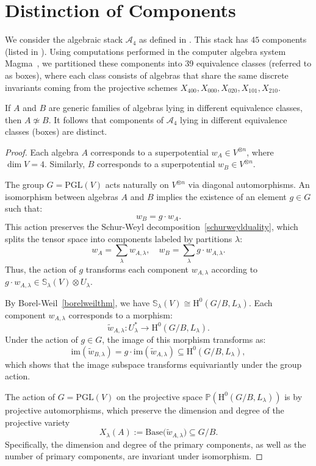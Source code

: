 \documentclass{amsart}
\begin{document}
\section{Distinction of Components}

\begin{theorem}\label{maintheorem-inv}
We consider the algebraic stack $\mathcal{A}_4$ as defined in \cite[page~10]{bhatoy-colin-felix-ravali-components}. This stack has $45$ components (listed in \cite[Table~4]{bhatoy-colin-felix-ravali-components}).
Using computations performed in the computer algebra system Magma~\cite{magma}, we partitioned these components into 39 equivalence classes (referred to as boxes), where each class consists of algebras that share the same discrete invariants coming from the projective schemes \(X_{400}, X_{000}, X_{020}, X_{101}, X_{210}\).

If \(A\) and \(B\) are generic families of algebras lying in different equivalence classes, then \(A \not\simeq B\). It follows that components of \(\mathcal{A}_4\) lying in different equivalence classes (boxes) are distinct.
\end{theorem}

\begin{proof}
Each algebra \( A \) corresponds to a superpotential \( w_A \in V^{\otimes n} \), where \( \dim V = 4 \). Similarly, \( B \) corresponds to a superpotential \( w_B \in V^{\otimes n} \).

The group \( G = \mathrm{PGL}(V) \) acts naturally on \( V^{\otimes n} \) via diagonal automorphisms. An isomorphism between algebras \( A \) and \( B \) implies the existence of an element \( g \in G \) such that:
\[
w_B = g \cdot w_A.
\]
This action preserves the Schur-Weyl decomposition~\ref{schurweylduality}, which splits the tensor space into components labeled by partitions $\lambda:$
\[
w_A = \sum_{\lambda} w_{A,\lambda}, \quad w_B = \sum_{\lambda} g \cdot w_{A,\lambda}.
\]
Thus, the action of \( g \) transforms each component \( w_{A,\lambda} \) according to \( g \cdot w_{A,\lambda} \in \mathbb{S}_\lambda(V) \otimes U_\lambda \).

By Borel-Weil~\ref{borelweilthm}, we have $\mathbb{S}_\lambda(V) \cong \mathrm{H}^0(G/B, L_\lambda).$
Each component \( w_{A,\lambda} \) corresponds to a morphism:
\[
\tilde{w}_{A,\lambda}: U_\lambda^* \to \mathrm{H}^0(G/B, L_\lambda).
\]
Under the action of \( g \in G \), the image of this morphism transforms as:
\[
\mathrm{im}(\tilde{w}_{B,\lambda}) = g \cdot \mathrm{im}(\tilde{w}_{A,\lambda}) \subseteq \mathrm{H}^0(G/B, L_\lambda),
\]
which shows that the image subspace transforms equivariantly under the group action.

The action of \( G = \mathrm{PGL}(V) \) on the projective space \( \mathbb{P}(\mathrm{H}^0(G/B, L_\lambda)) \) is by projective automorphisms, which preserve the dimension and degree of the projective variety 
\[
X_\lambda(A) := \mathrm{Base}\big( \tilde{w}_{A,\lambda} \big) \subseteq G/B.
\]
Specifically, the dimension and degree of the primary components, as well as the number of primary components, are invariant under isomorphism.
\end{proof}
\end{document}
